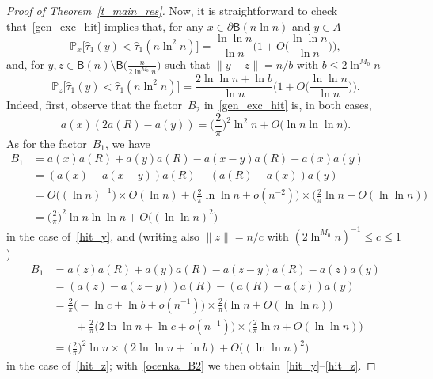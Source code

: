 \documentclass[11pt]{article}
\theoremstyle{definition}
\numberwithin{equation}{section}
\numberwithin{figure}{section}
\numberwithin{table}{section}
\newcommand{\1}[1]{{\mathbf 1}{\{#1\}}}
\newcommand{\8}{{\infty}}
\newcommand{\IP}{{\mathbb P}}
\newcommand{\htau}{\widehat{\tau}}
\newcommand{\B}{{\mathsf B}}
\begin{document}
\begin{proof}[Proof of Theorem~\ref{t_main_res}]
Now, it is straightforward to check that~\eqref{gen_exc_hit} implies that, for any $x\in \partial\B(n\ln n)$ and $y \in A$
\begin{equation}\label{hit_y}
\IP_x\big[\htau_1(y)<\htau_1(n\ln^2 n)\big] = \frac{\ln\ln n}{\ln n}
\Big(1+O\Big(\frac{\ln\ln n}{\ln n}\Big)\Big),
\end{equation}
and, for $y,z\in \B(n)\setminus\B\big(\frac{n}{2\ln^{M_0}n}\big)$ such that $\|y-z\| = n/b$ with $b\leq 2\ln^{M_0}n$
\begin{equation}\label{hit_z}
\IP_z\big[\htau_1(y)<\htau_1(n\ln^2 n)\big] =
\frac{2\ln\ln n + \ln b}{\ln n}
\Big(1+O\Big(\frac{\ln\ln n}{\ln n}\Big)\Big).
\end{equation}
Indeed, first, observe that the factor~$B_2$ in~\eqref{gen_exc_hit} is, in both cases,
\begin{equation}\label{ocenka_B2}
a(x)(2a(R)-a(y)) = \Big(\frac{2}{\pi}\Big)^2
\ln^2 n + O\big(\ln n\ln\ln n\big).
\end{equation}
As for the factor~$B_1$, we have
\begin{align*}
B_1 &= a(x)a(R)+a(y)a(R)-a(x-y)a(R)-a(x)a(y)\\
&= (a(x)-a(x-y))a(R) - (a(R)-a(x))a(y)\\
&= O\big((\ln n)^{-1}\big)\times O(\ln n) + \Big(\frac{2}{\pi}\ln\ln n + o(n^{-2})\Big)
\times \Big(\frac{2}{\pi}\ln n + O(\ln\ln n)\Big)\\
&= \Big(\frac{2}{\pi}\Big)^2
\ln n\ln\ln n + O\big((\ln\ln n)^2\big)
\end{align*}
in the case of~\eqref{hit_y}, and (writing also $\|z\|=n/c$ with $(2\ln^{M_0} n)^{-1}\leq c\leq 1$)
\begin{align*}
B_1 &= a(z)a(R)+a(y)a(R)-a(z-y)a(R)-a(z)a(y)\\
&= (a(z)-a(z-y))a(R) - (a(R)-a(z))a(y)\\
&= \frac{2}{\pi}\big(-\ln c +\ln b + o(n^{-1})\big)
\times \frac{2}{\pi}\big(\ln n + O(\ln\ln n)\big)\\
& \qquad + \frac{2}{\pi}\big(2\ln\ln n +\ln c + o(n^{-1})\big)
\times \Big(\frac{2}{\pi}\ln n + O(\ln\ln n)\Big)\\
&= \Big(\frac{2}{\pi}\Big)^2
\ln n\times(2\ln\ln n + \ln b) + O\big((\ln\ln n)^2\big)
\end{align*}
in the case of~\eqref{hit_z}; with~\eqref{ocenka_B2} we then obtain~\eqref{hit_y}--\eqref{hit_z}.


\end{proof}
\end{document}
